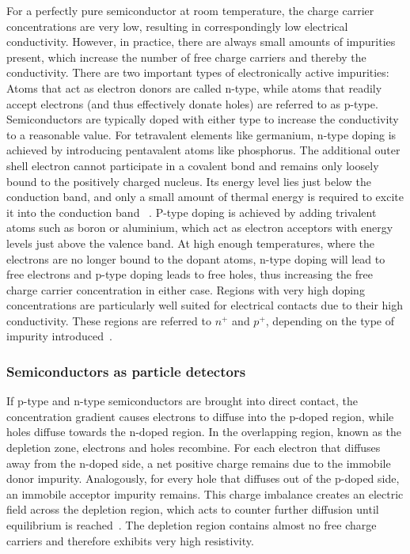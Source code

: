 For a perfectly pure semiconductor at room temperature, the charge carrier concentrations are very low, resulting in correspondingly low electrical conductivity. However, in practice, there are always small amounts of impurities present, which increase the number of free charge carriers and thereby the conductivity. 
There are two important types of electronically active impurities: Atoms that act as electron donors are called n-type, while atoms that readily accept electrons (and thus effectively donate holes) are referred to as p-type. 
Semiconductors are typically doped with either type to increase the conductivity to a reasonable value. 
For tetravalent elements like germanium, n-type doping is achieved by introducing pentavalent atoms like phosphorus. The additional outer shell electron cannot participate in a covalent bond and remains only loosely bound to the positively charged nucleus. Its energy level lies just below the conduction band, and only a small amount of thermal energy is required to excite it into the conduction band ~\cite{sze_semiconductor_2012, hofmann_solid_2015, knoll_radiation_2000}. 
P-type doping is achieved by adding trivalent atoms such as boron or aluminium, which act as electron acceptors with energy levels just above the valence band.
At high enough temperatures, where the electrons are no longer bound to the dopant atoms, n-type doping will lead to free electrons and p-type doping leads to free holes, thus increasing the free charge carrier concentration in either case. Regions with very high doping concentrations are particularly well suited for electrical contacts due to their high conductivity. These regions are referred to $n^{+}$ and $p^{+}$, depending on the type of impurity introduced~\cite{simon_oxford_2017, knoll_radiation_2000}. 


\subsubsection{Semiconductors as particle detectors}
If p-type and n-type semiconductors are brought into direct contact, the concentration gradient causes electrons to diffuse into the p-doped region, while holes diffuse towards the n-doped region. In the overlapping region, known as the depletion zone, electrons and holes recombine. For each electron that diffuses away from the n-doped side, a net positive charge remains due to the immobile donor impurity. 
Analogously, for every hole that diffuses out of the p-doped side, an immobile acceptor impurity remains. This charge imbalance creates an electric field across the depletion region, which acts to counter further diffusion until equilibrium is reached~\cite{knoll_radiation_2000, simon_oxford_2017}. 
The depletion region contains almost no free charge carriers and therefore exhibits very high resistivity. 


